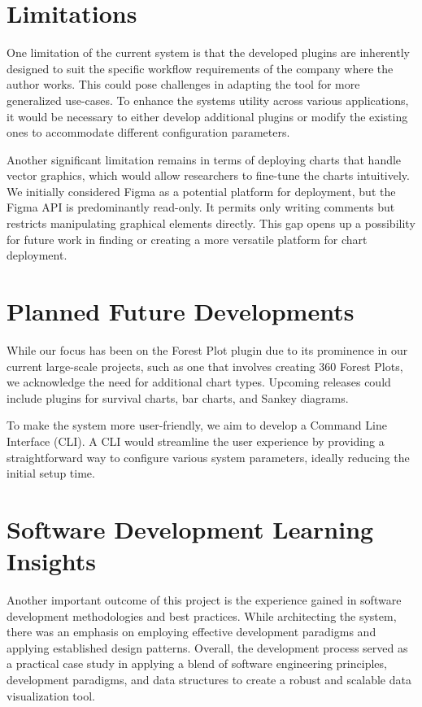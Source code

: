 \section{Limitations}\label{limitations}

One limitation of the current system is that the developed plugins are
inherently designed to suit the specific workflow requirements of the
company where the author works. This could pose challenges in adapting
the tool for more generalized use-cases. To enhance the
system\textquotesingle s utility across various applications, it would
be necessary to either develop additional plugins or modify the existing
ones to accommodate different configuration parameters.

Another significant limitation remains in terms of deploying charts that
handle vector graphics, which would allow researchers to fine-tune the
charts intuitively. We initially considered Figma as a potential
platform for deployment, but the Figma API is predominantly read-only.
It permits only writing comments but restricts manipulating graphical
elements directly. This gap opens up a possibility for future work in
finding or creating a more versatile platform for chart deployment.

\section{Planned Future
Developments}\label{planned-future-developments}

While our focus has been on the Forest Plot plugin due to its prominence
in our current large-scale projects, such as one that involves creating
360 Forest Plots, we acknowledge the need for additional chart types.
Upcoming releases could include plugins for survival charts, bar charts,
and Sankey diagrams.

To make the system more user-friendly, we aim to develop a Command Line
Interface (CLI). A CLI would streamline the user experience by providing
a straightforward way to configure various system parameters, ideally
reducing the initial setup time.

\section{Software Development Learning
Insights}\label{software-development-learning-insights}

Another important outcome of this project is the experience gained in
software development methodologies and best practices. While
architecting the system, there was an emphasis on employing effective
development paradigms and applying established design patterns. Overall,
the development process served as a practical case study in applying a
blend of software engineering principles, development paradigms, and
data structures to create a robust and scalable data visualization tool.
